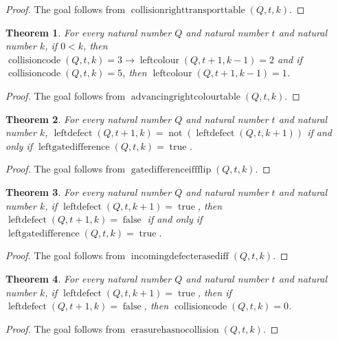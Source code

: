 \documentclass[11pt]{article}
\newtheorem{theorem}{Theorem}[section]
\theoremstyle{definition}
\begin{document}
\begin{proof}
The goal follows from \(\operatorname{collisionrighttransporttable}(Q, t, k)\).
\end{proof}
\begin{theorem}
\label{ll:observations:advancing-right-colour-table}
For every natural number \(Q\) and natural number \(t\) and natural number \(k\), if \(0 < k\), then \(\operatorname{collisioncode}(Q, t, k) = 3 \to \operatorname{leftcolour}(Q, t + 1, k - 1) = 2\) and if \(\operatorname{collisioncode}(Q, t, k) = 5\), then \(\operatorname{leftcolour}(Q, t + 1, k - 1) = 1\).
\end{theorem}
\begin{proof}
The goal follows from \(\operatorname{advancingrightcolourtable}(Q, t, k)\).
\end{proof}
\begin{theorem}
\label{ll:observations:gate-difference-iff-flip}
For every natural number \(Q\) and natural number \(t\) and natural number \(k\), \(\operatorname{leftdefect}(Q, t + 1, k) = \operatorname{not}(\operatorname{leftdefect}(Q, t, k + 1))\) if and only if \(\operatorname{leftgatedifference}(Q, t, k) = \operatorname{true}\).
\end{theorem}
\begin{proof}
The goal follows from \(\operatorname{gatedifferenceiffflip}(Q, t, k)\).
\end{proof}
\begin{theorem}
\label{ll:observations:incoming-defect-erased-iff}
For every natural number \(Q\) and natural number \(t\) and natural number \(k\), if \(\operatorname{leftdefect}(Q, t, k + 1) = \operatorname{true}\), then \(\operatorname{leftdefect}(Q, t + 1, k) = \operatorname{false}\) if and only if \(\operatorname{leftgatedifference}(Q, t, k) = \operatorname{true}\).
\end{theorem}
\begin{proof}
The goal follows from \(\operatorname{incomingdefecterasediff}(Q, t, k)\).
\end{proof}
\begin{theorem}
\label{ll:observations:erasure-has-no-collision}
For every natural number \(Q\) and natural number \(t\) and natural number \(k\), if \(\operatorname{leftdefect}(Q, t, k + 1) = \operatorname{true}\), then if \(\operatorname{leftdefect}(Q, t + 1, k) = \operatorname{false}\), then \(\operatorname{collisioncode}(Q, t, k) = 0\).
\end{theorem}
\begin{proof}
The goal follows from \(\operatorname{erasurehasnocollision}(Q, t, k)\).
\end{proof}
\end{document}
